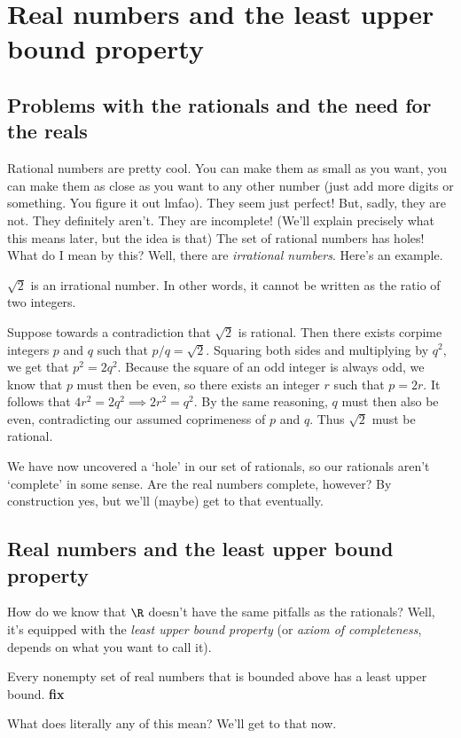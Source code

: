 \documentclass[class=article, crop=false]{standalone}
\begin{document}
\section{Real numbers and the least upper bound property}

\subsection{Problems with the rationals and the need for the reals}

Rational numbers are pretty cool. You can make them as small as you want, you can make them as close as you want to any other number (just add more digits or something. You figure it out lmfao). They seem just perfect! But, sadly, they are not. They definitely aren't. They are incomplete! (We'll explain precisely what this means later, but the idea is that) The set of rational numbers has holes! What do I mean by this? Well, there are \textit{irrational numbers}. Here's an example.

\begin{ex}
    $\sqrt{2}$ is an irrational number. In other words, it cannot be written as the ratio of two integers.
\end{ex}
\begin{pf}
    Suppose towards a contradiction that $\sqrt 2$ is rational. Then there exists corpime integers $p$ and $q$ such that $p/q = \sqrt 2$. Squaring both sides and multiplying by $q^2$, we get that $p^2 = 2q^2$. Because the square of an odd integer is always odd, we know that $p$ must then be even, so there exists an integer $r$ such that $p=2r$. It follows that $4r^2=2q^2 \implies 2r^2 = q^2$. By the same reasoning, $q$ must then also be even, contradicting our assumed coprimeness of $p$ and $q$. Thus $\sqrt 2$ must be rational.
\end{pf}
We have now uncovered a `hole' in our set of rationals, so our rationals aren't `complete' in some sense. Are the real numbers complete, however? By construction yes, but we'll (maybe) get to that eventually.

\subsection{Real numbers and the least upper bound property}

How do we know that $\R$ doesn't have the same pitfalls as the rationals? Well, it's equipped with the \textit{least upper bound property} (or \textit{axiom of completeness}, depends on what you want to call it).
    \begin{ax}
        Every nonempty set of real numbers that is bounded above has a least upper bound. \textbf{fix}
    \end{ax}
What does literally any of this mean? We'll get to that now.
\end{document}
